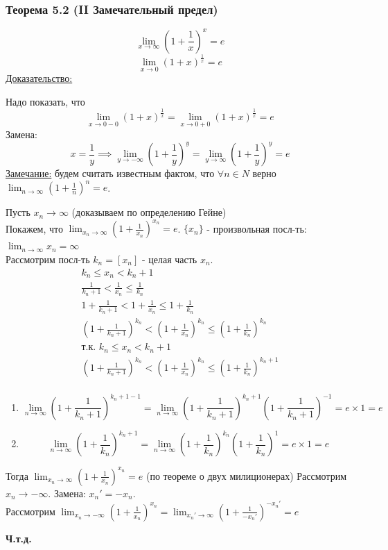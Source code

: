 \documentclass[12pt]{article}
\def\posl#1#2{\{#1_{#2}\}}
\begin{document}
    \subsubsection*{Теорема 5.2 (II Замечательный предел)}
    \[ \lim_{x\to\infty}(1 + \frac{1}{x})^x = e \]
    \[ \lim_{x\to 0}(1 + x)^{\frac{1}{x}} = e \]\noindent
    \underline{Доказательство:}
    \begin{adjustwidth}{1.5em}{1.5em}
        Надо показать, что \[\lim_{x\to 0-0} (1 + x)^{\frac{1}{x}} = \lim_{x\to 0+0}(1+x)^{\frac{1}{x}} = e\]
        Замена: \[x = \frac{1}{y} \implies \lim_{y\to -\infty}(1 + \frac{1}{y})^y = \lim_{y\to\infty}(1 + \frac{1}{y})^y = e\]
        \underline{Замечание:} будем считать известным фактом, что $\forall n \in N$ верно $\lim_{n\to\infty}(1+\frac{1}{n})^n = e$.\par\noindent
        Пусть $x_n \to \infty$ (доказываем по определению Гейне)\\
        Покажем, что $\lim_{x_n\to\infty}(1 + \frac{1}{x_n})^{x_n} = e$. $\posl{x}{n}$ - произвольная посл-ть: $\lim_{n\to\infty}x_n = \infty$\\
        Рассмотрим посл-ть $k_n = [x_n]$ - целая часть $x_n$.\\
        \begin{gather*}
            k_n \le x_n < k_n + 1\\
            \frac{1}{k_n + 1} < \frac{1}{x_n} \le \frac{1}{k_n}\\
            1 + \frac{1}{k_n + 1} < 1 + \frac{1}{x_n} \le 1 + \frac{1}{k_n}\\
            (1 + \frac{1}{k_n + 1})^{k_n} < (1 + \frac{1}{x_n})^{k_n} \le (1 + \frac{1}{k_n})^{k_n}\\
            \text{т.к. } k_n \le x_n < k_n + 1\\
            (1 + \frac{1}{k_n + 1})^{k_n} < (1 + \frac{1}{x_n})^{k_n} \le (1 + \frac{1}{k_n})^{k_n+1}\\
        \end{gather*}
        \begin{enumerate}
            \item \[\lim_{n\to\infty}(1+\frac{1}{k_n+1})^{k_n+1-1} = \lim_{n\to\infty}(1+\frac{1}{k_n+1})^{k_n+1}(1+\frac{1}{k_n+1})^{-1} = e \times 1 = e\]
            \item \[\lim_{n\to\infty}(1+\frac{1}{k_n})^{k_n+1} = \lim_{n\to\infty}(1+\frac{1}{k_n})^{k_n}(1+\frac{1}{k_n})^{1} = e \times 1 = e\]
        \end{enumerate}
        Тогда $\lim_{x_n \to \infty}(1 + \frac{1}{x_n})^{x_n} = e$ (по теореме о двух милиционерах)
        Рассмотрим $x_n \to -\infty$. Замена: $x_n' = -x_n$.\\
        Рассмотрим $\lim_{x_n \to -\infty}(1+\frac{1}{x_n})^{x_n} = \lim_{x_n'\to\infty}(1 + \frac{1}{-x_n'})^{-x_n'} = e$\\
        \begin{center}
            \textbf{Ч.т.д.}
        \end{center}
    \end{adjustwidth}
\end{document}
